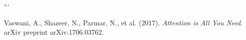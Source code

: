 





















































```








































Vaswani, A., Shazeer, N., Parmar, N., et al. (2017). \emph{Attention is All You Need}. arXiv preprint arXiv:1706.03762.













